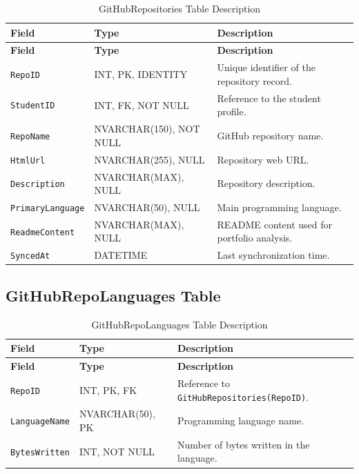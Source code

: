 \begin{longtable}{|>{\raggedright\arraybackslash}m{2.9cm}|>{\raggedright\arraybackslash}m{3.45cm}|>{\raggedright\arraybackslash}m{4.95cm}|}
\caption{GitHubRepositories Table Description}
\label{tab:github_repositories_table_description}
\\
\hline
\textbf{Field} & \textbf{Type} & \textbf{Description} \\
\hline
\endfirsthead
\hline
\textbf{Field} & \textbf{Type} & \textbf{Description} \\
\hline
\endhead
\texttt{RepoID} & INT, PK, IDENTITY & Unique identifier of the repository record. \\
\hline
\texttt{StudentID} & INT, FK, NOT NULL & Reference to the student profile. \\
\hline
\texttt{RepoName} & NVARCHAR(150), NOT NULL & GitHub repository name. \\
\hline
\texttt{HtmlUrl} & NVARCHAR(255), NULL & Repository web URL. \\
\hline
\texttt{Description} & NVARCHAR(MAX), NULL & Repository description. \\
\hline
\texttt{PrimaryLanguage} & NVARCHAR(50), NULL & Main programming language. \\
\hline
\texttt{ReadmeContent} & NVARCHAR(MAX), NULL & README content used for portfolio analysis. \\
\hline
\texttt{SyncedAt} & DATETIME & Last synchronization time. \\
\hline
\end{longtable}

\subsection{GitHubRepoLanguages Table}

\begin{longtable}{|>{\raggedright\arraybackslash}m{2.9cm}|>{\raggedright\arraybackslash}m{3.45cm}|>{\raggedright\arraybackslash}m{4.95cm}|}
\caption{GitHubRepoLanguages Table Description}
\label{tab:github_repo_languages_table_description}
\\
\hline
\textbf{Field} & \textbf{Type} & \textbf{Description} \\
\hline
\endfirsthead
\hline
\textbf{Field} & \textbf{Type} & \textbf{Description} \\
\hline
\endhead
\texttt{RepoID} & INT, PK, FK & Reference to \texttt{GitHubRepositories(RepoID)}. \\
\hline
\texttt{LanguageName} & NVARCHAR(50), PK & Programming language name. \\
\hline
\texttt{BytesWritten} & INT, NOT NULL & Number of bytes written in the language. \\
\hline
\end{longtable}

